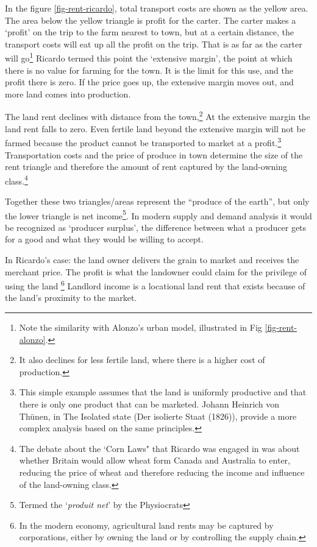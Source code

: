 In the figure \ref{fig-rent-ricardo}, total transport costs are shown as the yellow area. The area below the yellow triangle is profit for the carter. The carter makes a `profit' on the trip to the farm nearest to town, but at a certain distance, the transport costs will eat up all the profit on the trip. That is as far as the carter will go\footnote{Note the similarity with Alonzo's urban model, illustrated in Fig \ref{fig-rent-alonzo}.}
Ricardo termed this point the `extensive margin', the point at which there is no value for farming for the town. It is the limit for this use, and the profit there is zero. If the price goes up, the extensive margin moves out, and more land comes into production.

The land rent declines with distance from the town,\footnote{%
It also declines for less fertile land, where there is a higher cost of production.} At the extensive margin the land rent falls to zero. Even fertile land beyond the extensive margin will not be farmed because the product cannot be transported to market at a profit.\footnote{This simple example assumes that the land is uniformly productive and that there is only one product that can be marketed. Johann Heinrich von Th\"unen, in The Isolated state (Der isolierte Staat (1826)), provide a more complex analysis based on the same principles.} Transportation costs and the price of produce in town determine the size of the  rent triangle and therefore the amount of rent captured by the land-owning class.\footnote{The debate about the  `Corn Laws" that Ricardo  was engaged in was about whether Britain would allow wheat form Canada and Australia to enter, reducing the price of wheat and therefore reducing the income and influence of the land-owning class.} 

Together these two triangles/areas represent the ``produce of the earth'', but only the lower triangle is net income\footnote{ Termed the `\textit{produit net}' by the Physiocrats}. In modern supply and demand analysis it would be recognized as `producer surplus', the difference between what a producer gets for a good and what they would be willing to accept.

In Ricardo's case: the land owner delivers the grain to market and receives the merchant price. The profit is what the landowner could claim for the privilege of using the land %
\footnote{In the modern economy, agricultural land rents may be captured by corporations,  either by owning the land or by controlling the supply chain.}  Landlord income is a locational land rent that exists because of the land's proximity to the market. 
 

